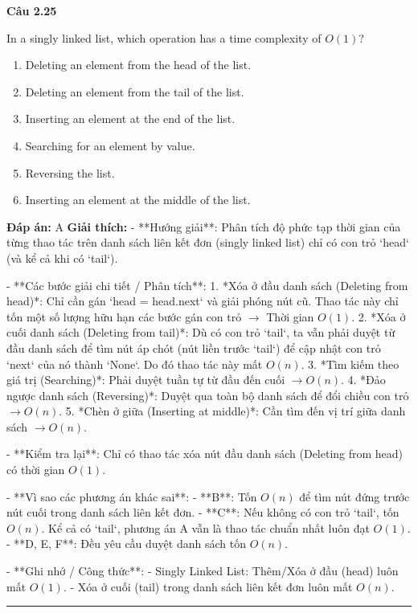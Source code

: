\documentclass[11pt,a4paper]{article}
\newenvironment{question}[1]{%
  \par\vspace{1em}\noindent\textbf{\large Câu #1}\par\vspace{0.4em}
}{%
  \par\vspace{1em}\hrule\vspace{0.6em}
}
\newenvironment{choices}{%
  \begin{enumerate}[label=\textbf{\Alph*.},leftmargin=2.2em,itemsep=2pt,topsep=3pt]
}{%
  \end{enumerate}
}
\newcommand{\choice}{\item}
\begin{document}
\begin{question}{2.25}
In a singly linked list, which operation has a time complexity of \(O(1)\)?
\begin{choices}
\choice Deleting an element from the head of the list.
\choice Deleting an element from the tail of the list.
\choice Inserting an element at the end of the list.
\choice Searching for an element by value.
\choice Reversing the list.
\choice Inserting an element at the middle of the list.
\end{choices}
\textbf{Đáp án:} A
\textbf{Giải thích:} - **Hướng giải**:
  Phân tích độ phức tạp thời gian của từng thao tác trên danh sách liên kết đơn (singly linked list) chỉ có con trỏ `head` (và kể cả khi có `tail`).

- **Các bước giải chi tiết / Phân tích**:
  1. *Xóa ở đầu danh sách (Deleting from head)*: Chỉ cần gán `head = head.next` và giải phóng nút cũ. Thao tác này chỉ tốn một số lượng hữu hạn các bước gán con trỏ \(\rightarrow\) Thời gian \(O(1)\).
  2. *Xóa ở cuối danh sách (Deleting from tail)*: Dù có con trỏ `tail`, ta vẫn phải duyệt từ đầu danh sách để tìm nút áp chót (nút liền trước `tail`) để cập nhật con trỏ `next` của nó thành `None`. Do đó thao tác này mất \(O(n)\).
  3. *Tìm kiếm theo giá trị (Searching)*: Phải duyệt tuần tự từ đầu đến cuối \(\rightarrow O(n)\).
  4. *Đảo ngược danh sách (Reversing)*: Duyệt qua toàn bộ danh sách để đổi chiều con trỏ \(\rightarrow O(n)\).
  5. *Chèn ở giữa (Inserting at middle)*: Cần tìm đến vị trí giữa danh sách \(\rightarrow O(n)\).

- **Kiểm tra lại**:
  Chỉ có thao tác xóa nút đầu danh sách (Deleting from head) có thời gian \(O(1)\).

- **Vì sao các phương án khác sai**:
  - **B**: Tốn \(O(n)\) để tìm nút đứng trước nút cuối trong danh sách liên kết đơn.
  - **C**: Nếu không có con trỏ `tail`, tốn \(O(n)\). Kể cả có `tail`, phương án A vẫn là thao tác chuẩn nhất luôn đạt \(O(1)\).
  - **D, E, F**: Đều yêu cầu duyệt danh sách tốn \(O(n)\).

- **Ghi nhớ / Công thức**:
  - Singly Linked List: Thêm/Xóa ở đầu (head) luôn mất \(O(1)\).
  - Xóa ở cuối (tail) trong danh sách liên kết đơn luôn mất \(O(n)\).
\end{question}
\end{document}
